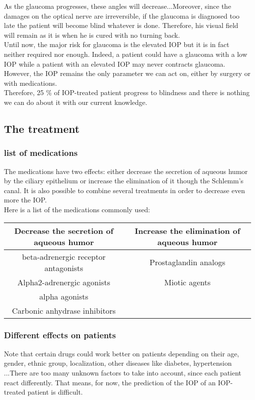\documentclass[english,12pt]{article}
\begin{document}
As the glaucoma progresses, these angles will decrease...Moreover, since the damages on the optical nerve are irreversible, if the glaucoma is diagnosed too late the patient will become blind whatever is done. Therefore, his visual field will remain as it is when he is cured with no turning back.\\
Until now, the major risk for glaucoma is the elevated IOP but it is in fact neither required nor enough. Indeed, a patient could have a glaucoma with a low IOP while a patient with an elevated IOP may never contracts glaucoma. However, the IOP remains the only parameter we can act on, either by surgery or with medications. \\
Therefore, 25 \% of IOP-treated patient progress to blindness and there is nothing we can do about it with our current knowledge.
\subsection{The treatment}
\subsubsection{list of medications}
The medications have two effects: either decrease the secretion of aqueous humor by the ciliary epithelium or increase the elimination of it though the Schlemm's canal. It is also possible to combine several treatments in order to decrease even more the IOP.\\
Here is a list of the medications commonly used:\\
\begin{tabular}{|c|c|}
\hline
Decrease the secretion of aqueous humor & Increase the elimination of aqueous humor\\
\hline
beta-adrenergic receptor antagonists & Prostaglandin analogs \\
Alpha2-adrenergic agonists & Miotic agents \\
alpha agonists &  \\
Carbonic anhydrase inhibitors &  \\
\hline
\end{tabular}
\subsubsection{Different effects on patients}
Note that certain drugs could work better on patients depending on their age, gender, ethnic group, localization, other diseases like diabetes, hypertension ...There are too many unknown factors to take into account, since each patient react differently. That means, for now, the prediction of the IOP of an IOP-treated patient is difficult.\\
\end{document}
